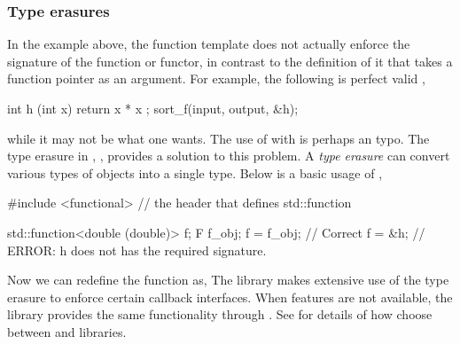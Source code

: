 \subsubsection{Type erasures}
\label{ssub:Type erasures}

In the example above, the function template  does not
actually enforce the signature of the function or functor, in contrast to the
definition of it that takes a function pointer as an argument. For example,
the following is perfect valid \cpp,
\begin{cppcode}
int h (int x) { return x * x };
sort_f(input, output, &h);
\end{cppcode}
while it may not be what one wants. The use of  with
 is perhaps an typo. The type erasure in \cppoo{},
, provides a solution to this problem. A \emph{type
  erasure} can convert various types of objects into a single type. Below is a
basic usage of ,
\begin{cppcode}
#include <functional> // the header that defines std::function

std::function<double (double)> f;
F f_obj;
f = f_obj;  // Correct
f = &h;     // ERROR: h does not has the required signature.
\end{cppcode}
Now we can redefine the function  as,
The \vsmc library makes extensive use of the type erasure to enforce certain
callback interfaces. When \cppoo features are not available, the \boost
library provides the same functionality through .
See \cite{vsmcjss} for details of how \vsmc choose between \cppoo and \boost
libraries.
